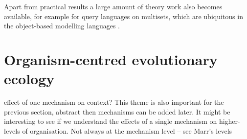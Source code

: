 \documentclass[phd]{infthesis}
\begin{document}
Apart from practical results a large amount of theory work also becomes
available, for example for query languages on multisets, which are ubiquitous in
the object-based modelling languages \citep{libkin_query_1997,
  buneman_comprehension_1994}.












\section{Organism-centred evolutionary ecology}
effect of one mechanism on context? This theme is also important for the
previous section, abstract then mechanisms can be added later. It might be
interesting to see if we understand the effects of a single mechanism on
higher-levels of organisation.
Not always at the mechanism level -- see Marr's levels
\end{document}
